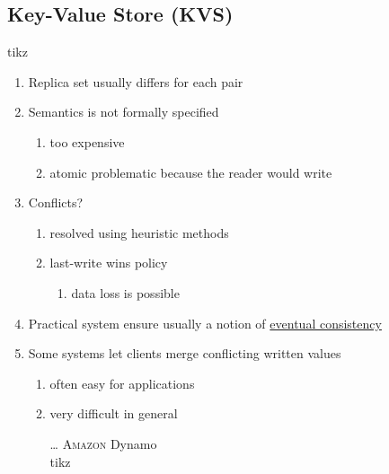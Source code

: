 \documentclass{article}
\begin{document}
\begin{adjustwidth}{2em}{2em}
		\subsection{Key-Value Store (KVS)}
		\begin{adjustwidth}{2em}{2em}
			tikz \\
			\begin{enumerate}[-]
				\item Replica set usually differs for each pair
				\item Semantics is not formally specified
				\begin{enumerate}[\ldots]
					\item too expensive
					\item atomic problematic because the reader would write
				\end{enumerate}
				\item Conflicts?
				\begin{enumerate}[\small{\textbullet}]
					\item resolved using heuristic methods
					\item last-write wins policy
					\begin{enumerate}[\ldots]
						\item data loss is possible
					\end{enumerate}
				\end{enumerate}
				\item Practical system ensure usually a notion of \underline{eventual consistency}
				\item Some systems let clients merge conflicting written values
				\begin{enumerate}[\small{\textbullet}]
					\item often easy for applications
					\item very difficult in general
					\item[\ldots] \textsc{Amazon} Dynamo \\
					tikz
				\end{enumerate}
			\end{enumerate}
		\end{adjustwidth}
	\end{adjustwidth}
	
	\newpage
	
\end{document}
